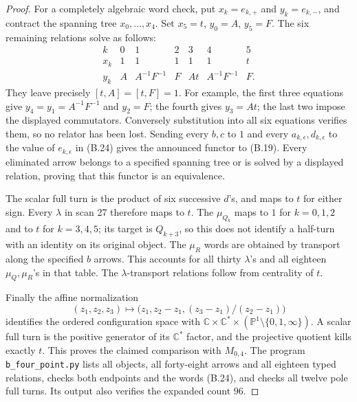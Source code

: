 \begin{proof}
For a completely algebraic word check, put
$x_k=e_{k,+}$ and $y_k=e_{k,-}$, and contract the spanning tree
$x_0,\ldots,x_4$.  Set $x_5=t$, $y_0=A$, $y_5=F$.  The six
remaining relations solve as follows:
\[
\begin{array}{c|rrrrrr}
k&0&1&2&3&4&5\\ \hline
x_k&1&1&1&1&1&t\\
y_k&A&A^{-1}F^{-1}&F&At&A^{-1}F^{-1}&F.
\end{array}                                                   \tag{B.24}
\]
They leave precisely $[t,A]=[t,F]=1$.  For example, the first
three equations give $y_4=y_1=A^{-1}F^{-1}$ and $y_2=F$; the
fourth gives $y_3=At$; the last two impose the displayed
commutators.  Conversely substitution into all six equations
verifies them, so no relator has been lost.  Sending every $b,c$
to $1$ and every $a_{k,\epsilon},d_{k,\epsilon}$ to the value
of $e_{k,\epsilon}$ in (B.24) gives the announced functor to
(B.19).  Every eliminated arrow belongs to a specified spanning
tree or is solved by a displayed relation, proving that this
functor is an equivalence.

The scalar full turn is the product of six successive $d$'s,
and maps to $t$ for either sign.  Every $\lambda$ in scan 27
therefore maps to $t$.  The $\mu_{Q_k}$ maps to $1$ for
$k=0,1,2$ and to $t$ for $k=3,4,5$; its target is $Q_{k+3}$,
so this does not identify a half-turn with an identity on its
original object.  The $\mu_R$ words are obtained by transport
along the specified $b$ arrows.  This accounts for all thirty
$\lambda$'s and all eighteen $\mu_Q,\mu_R$'s in that table.
The $\lambda$-transport relations follow from centrality of $t$.

Finally the affine normalization
\[
 (z_1,z_2,z_3)\longmapsto
 \bigl(z_1,z_2-z_1,(z_3-z_1)/(z_2-z_1)\bigr)
\]
identifies the ordered configuration space with
$\mathbb C\times\mathbb C^*\times
 (\mathbb P^1\setminus\{0,1,\infty\})$.
A scalar full turn is the positive generator of its
$\mathbb C^*$ factor, and the projective quotient kills exactly
$t$.  This proves the claimed comparison with $M_{0,4}$.
The program \texttt{b\_four\_point.py} lists all objects,
all forty-eight arrows and all eighteen typed relations, checks
both endpoints and the words (B.24), and checks all twelve pole
full turns.  Its output also verifies the expanded count $96$.
\end{proof}

